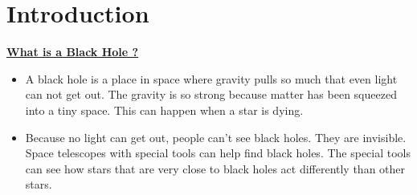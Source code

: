 \documentclass[../tuto-3.tex]{subfiles}
\begin{document}
	
	\section{Introduction}
	
	\underline{\textbf{What is a Black Hole ? \cite{whatIsBlackHole}}}
	
		\begin{itemize}
		\item
		A black hole is a place in space where gravity pulls so much that even light can not get out. The gravity is so strong because matter has been squeezed into a tiny space. This can happen when a star is dying.
		
		\item
		Because no light can get out, people can't see black holes. They are invisible. Space telescopes with special tools can help find black holes. The special tools can see how stars that are very close to black holes act differently than other stars.
	\end{itemize}
	
	\pagebreak
\end{document}
